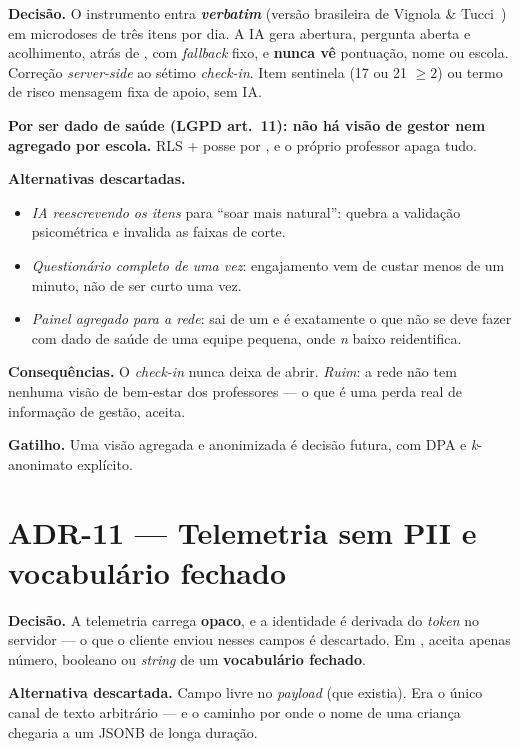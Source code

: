 \textbf{Decisão.} O instrumento entra \textbf{\emph{verbatim}} (versão brasileira
de Vignola \& Tucci~\cite{vignola2014dass21}) em microdoses de três itens por dia.
A IA gera abertura, pergunta aberta e acolhimento, atrás de
, com \emph{fallback} fixo, e \textbf{nunca vê}
pontuação, nome ou escola. Correção \emph{server-side} ao sétimo \emph{check-in}.
Item sentinela (17 ou 21 $\geq 2$) ou termo de risco \implica{} mensagem fixa de
apoio, sem IA.

\textbf{Por ser dado de saúde (LGPD art.~11): não há visão de gestor nem agregado
por escola.} RLS + posse por , e o próprio professor apaga tudo.

\textbf{Alternativas descartadas.}
\begin{itemize}
  \item \emph{IA reescrevendo os itens} para \enquote{soar mais natural}:
    quebra a validação psicométrica e invalida as faixas de corte.
  \item \emph{Questionário completo de uma vez}: engajamento vem de custar menos
    de um minuto, não de ser curto uma vez.
  \item \emph{Painel agregado para a rede}: sai de um  e é
    exatamente o que não se deve fazer com dado de saúde de uma equipe pequena,
    onde \emph{n} baixo reidentifica.
\end{itemize}

\textbf{Consequências.} O \emph{check-in} nunca deixa de abrir. \emph{Ruim}: a
rede não tem nenhuma visão de bem-estar dos professores --- o que é uma perda
real de informação de gestão, aceita.

\textbf{Gatilho.} Uma visão agregada e anonimizada é decisão futura, com DPA e
\emph{k}-anonimato explícito.

\section{ADR-11 --- Telemetria sem PII e vocabulário fechado}

\textbf{Decisão.} A telemetria carrega  \textbf{opaco}, e a
identidade é derivada do \emph{token} no servidor --- o que o cliente enviou nesses
campos é descartado. Em ,  aceita
apenas número, booleano ou \emph{string} de um \textbf{vocabulário fechado}.

\textbf{Alternativa descartada.} Campo  livre no \emph{payload} (que
existia). Era o único canal de texto arbitrário --- e o caminho por onde o nome de
uma criança chegaria a um JSONB de longa duração.

